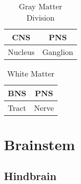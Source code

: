 \begin{table}[htbp]
    \centering
    \begin{tabular}{cc}
        \toprule
        \textbf{CNS} & \textbf{PNS} \\ \midrule
        Nucleus & Ganglion \\
        \bottomrule
    \end{tabular}
    \caption{Gray Matter Division}\label{tab:}
\end{table}

\begin{table}[htbp]
    \centering
    \begin{tabular}{cc}
        \toprule
        \textbf{BNS} & \textbf{PNS} \\ \midrule
        Tract & Nerve \\
        \bottomrule
    \end{tabular}
    \caption{White Matter}\label{tab:}
\end{table}

\section{Brainstem}

\subsection{Hindbrain}


